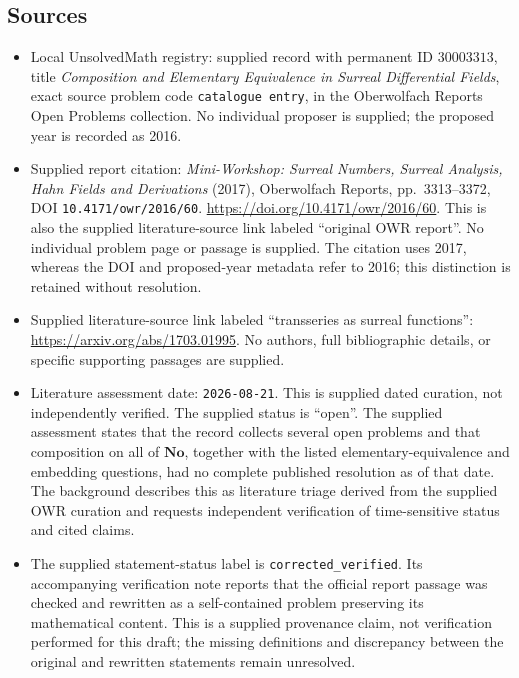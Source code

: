 \documentclass[11pt]{article}
\begin{document}
\subsection{Sources}
\begin{itemize}
\item Local UnsolvedMath registry: supplied record with permanent ID \(30003313\), title \emph{Composition and Elementary Equivalence in Surreal Differential Fields}, exact source problem code \texttt{catalogue entry}, in the Oberwolfach Reports Open Problems collection. No individual proposer is supplied; the proposed year is recorded as 2016.
\item Supplied report citation: \emph{Mini-Workshop: Surreal Numbers, Surreal Analysis, Hahn Fields and Derivations} (2017), Oberwolfach Reports, pp.~3313--3372, DOI \texttt{10.4171/owr/2016/60}. \url{https://doi.org/10.4171/owr/2016/60}. This is also the supplied literature-source link labeled ``original OWR report''. No individual problem page or passage is supplied. The citation uses 2017, whereas the DOI and proposed-year metadata refer to 2016; this distinction is retained without resolution.
\item Supplied literature-source link labeled ``transseries as surreal functions'': \url{https://arxiv.org/abs/1703.01995}. No authors, full bibliographic details, or specific supporting passages are supplied.
\item Literature assessment date: \texttt{2026-08-21}. This is supplied dated curation, not independently verified. The supplied status is ``open''. The supplied assessment states that the record collects several open problems and that composition on all of \(\mathbf{No}\), together with the listed elementary-equivalence and embedding questions, had no complete published resolution as of that date. The background describes this as literature triage derived from the supplied OWR curation and requests independent verification of time-sensitive status and cited claims.
\item The supplied statement-status label is \texttt{corrected\_verified}. Its accompanying verification note reports that the official report passage was checked and rewritten as a self-contained problem preserving its mathematical content. This is a supplied provenance claim, not verification performed for this draft; the missing definitions and discrepancy between the original and rewritten statements remain unresolved.
\end{itemize}
\end{document}
